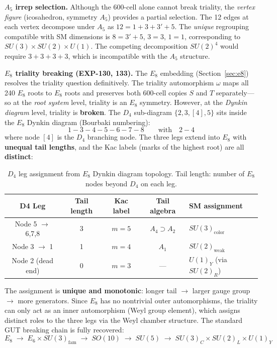 \documentclass[12pt,a4paper]{article}
\begin{document}
\textbf{$A_5$ irrep selection.} Although the 600-cell alone cannot break triality, the \emph{vertex figure} (icosahedron, symmetry $A_5$) provides a partial selection. The 12 edges at each vertex decompose under $A_5$ as $12 = 1 + 3 + 3' + 5$. The \emph{unique} regrouping compatible with SM dimensions is $8 = 3' + 5$, $3 = 3$, $1 = 1$, corresponding to $SU(3) \times SU(2) \times U(1)$. The competing decomposition $SU(2)^4$ would require $3 + 3 + 3 + 3$, which is incompatible with the $A_5$ structure.

\textbf{$E_8$ triality breaking (EXP-130, 133).} The $E_8$ embedding (Section~\ref{sec:e8}) resolves the triality question definitively. The triality automorphism $\omega$ maps all 240 $E_8$ roots to $E_8$ roots and preserves both 600-cell copies $S$ and $T$ separately---so at the \emph{root system} level, triality is an $E_8$ symmetry. However, at the \emph{Dynkin diagram} level, triality is \textbf{broken}. The $D_4$ sub-diagram $\{2, 3, [4], 5\}$ sits inside the $E_8$ Dynkin diagram (Bourbaki numbering):
\begin{equation}
1 - 3 - \boxed{4} - 5 - 6 - 7 - 8 \qquad \text{with} \quad 2 - \boxed{4}
\end{equation}
where node $[4]$ is the $D_4$ branching node. The three legs extend into $E_8$ with \textbf{unequal tail lengths}, and the Kac labels (marks of the highest root) are all \textbf{distinct}:

\begin{table}[H]
\centering
\begin{tabular}{ccccl}
\toprule
\textbf{D4 Leg} & \textbf{Tail length} & \textbf{Kac label} & \textbf{Tail algebra} & \textbf{SM assignment} \\
\midrule
Node 5 $\to$ 6,7,8 & 3 & $m = 5$ & $A_4 \supset A_2$ & $SU(3)_{\text{color}}$ \\
Node 3 $\to$ 1       & 1 & $m = 4$ & $A_1$              & $SU(2)_{\text{weak}}$ \\
Node 2 (dead end)     & 0 & $m = 3$ & ---                & $U(1)_Y$ (via $SU(2)_R$) \\
\bottomrule
\end{tabular}
\caption{$D_4$ leg assignment from $E_8$ Dynkin diagram topology. Tail length: number of $E_8$ nodes beyond $D_4$ on each leg.}
\end{table}

The assignment is \textbf{unique and monotonic}: longer tail $\to$ larger gauge group $\to$ more generators. Since $E_8$ has no nontrivial outer automorphisms, the triality can only act as an inner automorphism (Weyl group element), which assigns distinct roles to the three legs via the Weyl chamber structure. The standard GUT breaking chain is fully recovered:
\begin{equation}
E_8 \;\to\; E_6 \times SU(3)_{\text{fam}} \;\to\; SO(10) \;\to\; SU(5) \;\to\; SU(3)_C \times SU(2)_L \times U(1)_Y
\end{equation}
\end{document}

